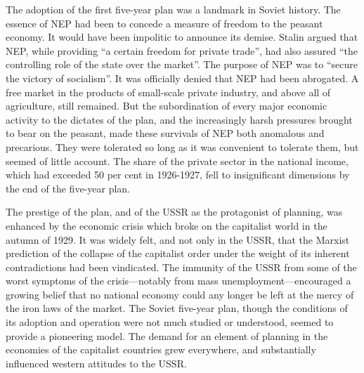 The adoption of the first five-year plan was a landmark in Soviet history. The essence of NEP had been to concede a measure of freedom to the peasant economy. It would have been impolitic to announce its demise. Stalin argued that NEP, while providing ``a certain freedom for private trade'', had also assured ``the controlling role of the state over the market''. The purpose of NEP was to ``secure the victory of socialism''. It was officially denied that NEP had been abrogated. A free market in the products of small-scale private industry, and above all of agriculture, still remained. But the subordination of every major economic activity to the dictates of the plan, and the increasingly harsh pressures brought to bear on the peasant, made these survivals of NEP both anomalous and precarious. They were tolerated so long as it was convenient to tolerate them, but seemed of little account. The share of the private sector in the national income, which had exceeded 50 per cent in 1926-1927, fell to insignificant dimensions by the end of the five-year plan. 

The prestige of the plan, and of the USSR as the protagonist of planning, was enhanced by the economic crisis which broke on the capitalist world in the autumn of 1929. It was widely felt, and not only in the USSR, that the Marxist prediction of the collapse of the capitalist order under the weight of its inherent contradictions had been vindicated. The immunity of the USSR from some of the worst symptoms of the crisis---notably from mass unemployment---encouraged a growing belief that no national economy could any longer be left at the mercy of the iron laws of the market. The Soviet five-year plan, though the conditions of its adoption and operation were not much studied or understood, seemed to provide a pioneering model. The demand for an element of planning in the economies of the capitalist countries grew everywhere, and substantially influenced western attitudes to the USSR. 

